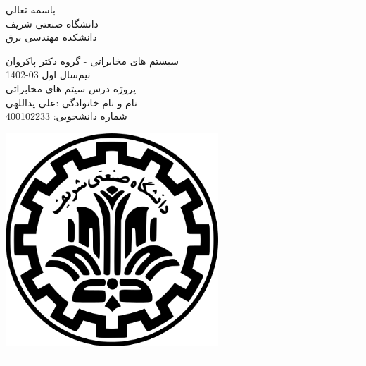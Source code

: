 \documentclass[a4paper]{article}
\begin{document}
	
	\newcommand{\Int}{\int\limits}
	\begin{minipage}{0.6\textwidth}
		\begin{bf}
			\begin{center}
				باسمه تعالی\\
				\vspace{0.25cm}
				دانشگاه صنعتی شریف\\
				\vspace{0.25cm}
				دانشکده مهندسی برق\\
				\vspace{0.5cm}
				
				\large
				سیستم های مخابراتی - گروه دکتر پاکروان \\
				نیم‌سال اول
				03-1402\\
				\Large
				پروژه درس سیتم های مخابراتی\\
				نام و نام خانوادگی :علی یداللهی
				\\
				شماره دانشجویی: 400102233
			\end{center}
		\end{bf}
		\normalsize
	\end{minipage} \hfill
	\begin{minipage}{0.35\textwidth}
		
		\begin{flushleft}
			\includegraphics[width=0.6\textwidth]{Shariflogo.png}\\ \large
		\end{flushleft}
		
	\end{minipage}
	
	
	\rule{\textwidth}{1.5pt}
	\large
\end{document}
